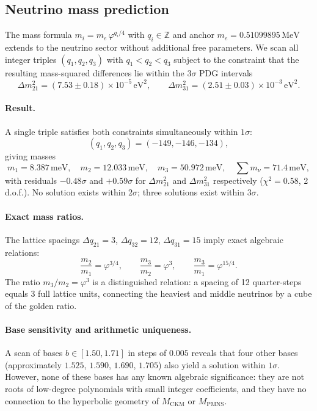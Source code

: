 ﻿\documentclass[12pt]{article}
\theoremstyle{definition}
\begin{document}
\subsection{Neutrino mass prediction}
\label{subsec:neutrino}

The mass formula $m_i = m_e\,\varphi^{q_i/4}$ with $q_i\in\mathbb{Z}$
and anchor $m_e = 0.51099895\,\text{MeV}$ extends to the neutrino sector
without additional free parameters.  We scan all integer triples
$(q_1,q_2,q_3)$ with $q_1<q_2<q_3$ subject to the constraint that the
resulting mass-squared differences lie within the $3\sigma$ PDG
intervals~\cite{PDG2024}
\begin{equation}
\Delta m^2_{21} = (7.53\pm0.18)\times10^{-5}\,\text{eV}^2, \qquad
\Delta m^2_{31} = (2.51\pm0.03)\times10^{-3}\,\text{eV}^2.
\end{equation}

\paragraph{Result.}
A single triple satisfies both constraints simultaneously within
$1\sigma$:
\begin{equation}
(q_1,q_2,q_3) = (-149,-146,-134),
\end{equation}
giving masses
\begin{equation}
m_1 = 8.387\,\text{meV},\quad
m_2 = 12.033\,\text{meV},\quad
m_3 = 50.972\,\text{meV},\quad
\sum m_\nu = 71.4\,\text{meV},
\end{equation}
with residuals $-0.48\sigma$ and $+0.59\sigma$ for $\Delta m^2_{21}$
and $\Delta m^2_{31}$ respectively ($\chi^2 = 0.58$, 2\,d.o.f.).
No solution exists within $2\sigma$; three solutions exist within
$3\sigma$.

\paragraph{Exact mass ratios.}
The lattice spacings $\Delta q_{21}=3$, $\Delta q_{32}=12$,
$\Delta q_{31}=15$ imply exact algebraic relations:
\begin{equation}
\frac{m_2}{m_1} = \varphi^{3/4},\qquad
\frac{m_3}{m_2} = \varphi^{3},\qquad
\frac{m_3}{m_1} = \varphi^{15/4}.
\end{equation}
The ratio $m_3/m_2 = \varphi^3$ is a distinguished relation: a spacing
of 12 quarter-steps equals 3 full lattice units, connecting the heaviest
and middle neutrinos by a cube of the golden ratio.

\paragraph{Base sensitivity and arithmetic uniqueness.}
A scan of bases $b\in[1.50,1.71]$ in steps of $0.005$ reveals that
four other bases (approximately $1.525$, $1.590$, $1.690$, $1.705$)
also yield a solution within $1\sigma$.  However, none of these bases
has any known algebraic significance: they are not roots of low-degree
polynomials with small integer coefficients, and they have no connection
to the hyperbolic geometry of $M_\text{CKM}$ or $M_\text{PMNS}$.
\end{document}
